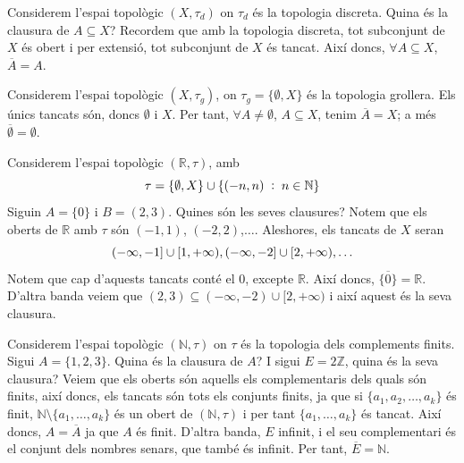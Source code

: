 \documentclass[../main.tex]{subfiles}
\begin{document}
\begin{ej}
\label{ej:clausura3} Considerem l'espai topològic $(X,\tau_d)$ on $\tau_d$ és la topologia discreta. Quina és la clausura de $A\subseteq X$? Recordem que amb la topologia discreta, tot subconjunt de $X$ és obert i per extensió, tot subconjunt de $X$ és tancat. Així doncs, $\forall A\subseteq X$, $\overline{A} = A$.
\end{ej}

\begin{ej}
\label{ej:clausura4} Considerem l'espai topològic $(X,\tau_g)$, on $\tau_g = \{\emptyset, X\}$ és la topologia grollera. Els únics tancats són, doncs $\emptyset$ i $X$. Per tant, $\forall A\not=\emptyset$, $A\subseteq X$, tenim $\overline{A} = X$; a més $\overline{\emptyset}= \emptyset$.
\end{ej}

\begin{ej}
\label{ej:clausura5} Considerem l'espai topològic $(\mathbb{R},\tau)$, amb
\begin{equation}
    \notag
    \tau = \{\emptyset, X\}\cup\{(-n,n)\;:\;n\in\mathbb{N}\}
\end{equation}
Siguin $A = \{0\}$ i $B = (2,3)$. Quines són les seves clausures? Notem que els oberts de $\mathbb{R}$ amb $\tau$ són $(-1,1)$, $(-2,2)$,$\ldots$. Aleshores, els tancats de $X$ seran
\begin{equation}
    \notag
    (-\infty,-1]\cup[1,+\infty),(-\infty,-2]\cup[2,+\infty),\ldots 
\end{equation}
Notem que cap d'aquests tancats conté el 0, excepte $\mathbb{R}$. Així doncs, $\overline{\{0\}}=\mathbb{R}$. D'altra banda veiem que $(2,3)\subseteq(-\infty,-2)\cup[2,+\infty)$ i així aquest és la seva clausura.
\end{ej}

\begin{ej}
\label{ej:clausura6} Considerem l'espai topològic $(\mathbb{N},\tau)$ on $\tau$ és la topologia dels complements finits. Sigui $A = \{1,2,3\}$. Quina és la clausura de $A$? I sigui $E = 2\mathbb{Z}$, quina és la seva clausura? Veiem que els oberts són aquells els complementaris dels quals són finits, així doncs, els tancats són tots els conjunts finits, ja que si $\{a_1,a_2,\ldots,a_k\}$ és finit, $\mathbb{N}\setminus\{a_1,\ldots,a_k\}$ és un obert de $(\mathbb{N},\tau)$ i per tant $\{a_1,\ldots,a_k\}$ és tancat. Així doncs, $A = \overline{A}$ ja que $A$ és finit. D'altra banda, $E$ infinit, i el seu complementari és el conjunt dels nombres senars, que també és infinit. Per tant, $\overline{E} = \mathbb{N}$.
\end{ej}
\end{document}
